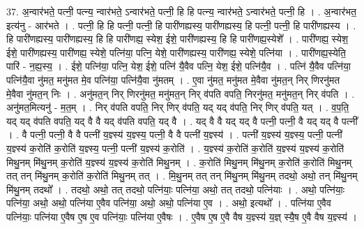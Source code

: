 \documentclass[17pt]{extarticle}
\begin{document}
37. अ॒न्वार॑भते॒ पत्नी॒ पत्न्य॒ न्वार॑भते॒ ऽन्वार॑भते॒ पत्नी॒ हि हि पत्न्य॒ न्वार॑भते॒ ऽन्वार॑भते॒ पत्नी॒ हि । . अ॒न्वार॑भत॒ इत्य॑नु - आर॑भते । . पत्नी॒ हि हि पत्नी॒ पत्नी॒ हि पारी॑णह्यस्य॒ पारी॑णह्यस्य॒ हि पत्नी॒ पत्नी॒ हि पारी॑णह्यस्य । . हि पारी॑णह्यस्य॒ पारी॑णह्यस्य॒ हि हि पारी॑णह्य॒ स्येश॒ ईशे॒ पारी॑णह्यस्य॒ हि हि पारी॑णह्य॒स्येशे᳚ । . पारी॑णह्य॒ स्येश॒ ईशे॒ पारी॑णह्यस्य॒ पारी॑णह्य॒ स्येशे॒ पत्नि॑या॒ पत्नि॒ येशे॒ पारी॑णह्यस्य॒ पारी॑णह्य॒ स्येशे॒ पत्नि॑या । . पारी॑णह्य॒स्येति॒ पारि॑ - न॒ह्य॒स्य॒ । . ईशे॒ पत्नि॑या॒ पत्नि॒ येश॒ ईशे॒ पत्नि॑ यै॒वैव पत्नि॒ येश॒ ईशे॒ पत्नि॑यै॒व । . पत्नि॑ यै॒वैव पत्नि॑या॒ पत्नि॑यै॒वा नु॑मत॒ मनु॑मत मे॒व पत्नि॑या॒ पत्नि॑यै॒वा नु॑मतम् । . ए॒वा नु॑मत॒ मनु॑मत मे॒वैवा नु॑मत॒न् निर् णिरनु॑मत मे॒वैवा नु॑मत॒न् निः । . अनु॑मत॒न् निर् णिरनु॑मत॒ मनु॑मत॒न् निर् व॑पति वपति॒ निरनु॑मत॒ मनु॑मत॒न् निर् व॑पति । . अनु॑मत॒मित्यनु॑ - म॒त॒म् । . निर् व॑पति वपति॒ निर् णिर् व॑पति॒ यद् यद् व॑पति॒ निर् णिर् व॑पति॒ यत् । . व॒प॒ति॒ यद् यद् व॑पति वपति॒ यद् वै वै यद् व॑पति वपति॒ यद् वै । . यद् वै वै यद् यद् वै पत्नी॒ पत्नी॒ वै यद् यद् वै पत्नी᳚ । . वै पत्नी॒ पत्नी॒ वै वै पत्नी॑ य॒ज्ञ्स्य॑ य॒ज्ञ्स्य॒ पत्नी॒ वै वै पत्नी॑ य॒ज्ञ्स्य॑ । . पत्नी॑ य॒ज्ञ्स्य॑ य॒ज्ञ्स्य॒ पत्नी॒ पत्नी॑ य॒ज्ञ्स्य॑ क॒रोति॑ क॒रोति॑ य॒ज्ञ्स्य॒ पत्नी॒ पत्नी॑ य॒ज्ञ्स्य॑ क॒रोति॑ । . य॒ज्ञ्स्य॑ क॒रोति॑ क॒रोति॑ य॒ज्ञ्स्य॑ य॒ज्ञ्स्य॑ क॒रोति॑ मिथु॒नम् मि॑थु॒नम् क॒रोति॑ य॒ज्ञ्स्य॑ य॒ज्ञ्स्य॑ क॒रोति॑ मिथु॒नम् । . क॒रोति॑ मिथु॒नम् मि॑थु॒नम् क॒रोति॑ क॒रोति॑ मिथु॒नम् तत् तन् मि॑थु॒नम् क॒रोति॑ क॒रोति॑ मिथु॒नम् तत् । . मि॒थु॒नम् तत् तन् मि॑थु॒नम् मि॑थु॒नम् तदथो॒ अथो॒ तन् मि॑थु॒नम् मि॑थु॒नम् तदथो᳚ । . तदथो॒ अथो॒ तत् तदथो॒ पत्नि॑याः॒ पत्नि॑या॒ अथो॒ तत् तदथो॒ पत्नि॑याः । . अथो॒ पत्नि॑याः॒ पत्नि॑या॒ अथो॒ अथो॒ पत्नि॑या ए॒वैव पत्नि॑या॒ अथो॒ अथो॒ पत्नि॑या ए॒व । . अथो॒ इत्यथो᳚ । . पत्नि॑या ए॒वैव पत्नि॑याः॒ पत्नि॑या ए॒वैष ए॒ष ए॒व पत्नि॑याः॒ पत्नि॑या ए॒वैषः । . ए॒वैष ए॒ष ए॒वै वैष य॒ज्ञ्स्य॑ य॒ज्ञ् स्यै॒ष ए॒वै वैष य॒ज्ञ्स्य॑ । \newline
\pagebreak
{}
\end{document}
